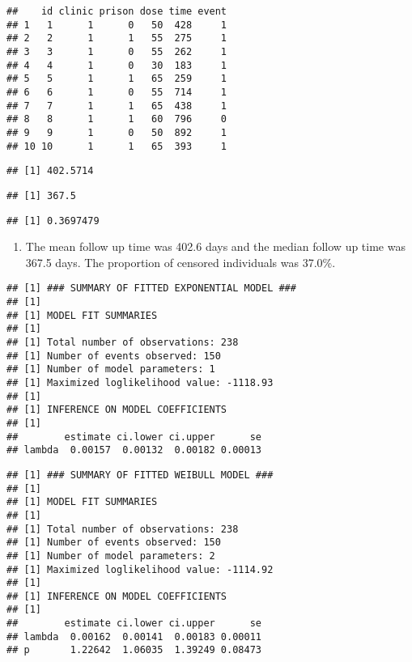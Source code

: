 \documentclass[
]{article}
\providecommand{\tightlist}{%
  \setlength{\itemsep}{0pt}\setlength{\parskip}{0pt}}
\begin{document}
\begin{verbatim}
##    id clinic prison dose time event
## 1   1      1      0   50  428     1
## 2   2      1      1   55  275     1
## 3   3      1      0   55  262     1
## 4   4      1      0   30  183     1
## 5   5      1      1   65  259     1
## 6   6      1      0   55  714     1
## 7   7      1      1   65  438     1
## 8   8      1      1   60  796     0
## 9   9      1      0   50  892     1
## 10 10      1      1   65  393     1
\end{verbatim}

\begin{verbatim}
## [1] 402.5714
\end{verbatim}

\begin{verbatim}
## [1] 367.5
\end{verbatim}

\begin{verbatim}
## [1] 0.3697479
\end{verbatim}

\begin{enumerate}
\def\labelenumi{(\alph{enumi})}
\tightlist
\item
  The mean follow up time was 402.6 days and the median follow up time
  was 367.5 days. The proportion of censored individuals was 37.0\%.
\end{enumerate}

\begin{verbatim}
## [1] ### SUMMARY OF FITTED EXPONENTIAL MODEL ###
## [1] 
## [1] MODEL FIT SUMMARIES
## [1] 
## [1] Total number of observations: 238  
## [1] Number of events observed: 150  
## [1] Number of model parameters: 1  
## [1] Maximized loglikelihood value: -1118.93  
## [1] 
## [1] INFERENCE ON MODEL COEFFICIENTS
## [1] 
##        estimate ci.lower ci.upper      se
## lambda  0.00157  0.00132  0.00182 0.00013
\end{verbatim}

\begin{verbatim}
## [1] ### SUMMARY OF FITTED WEIBULL MODEL ###
## [1] 
## [1] MODEL FIT SUMMARIES
## [1] 
## [1] Total number of observations: 238  
## [1] Number of events observed: 150  
## [1] Number of model parameters: 2  
## [1] Maximized loglikelihood value: -1114.92  
## [1] 
## [1] INFERENCE ON MODEL COEFFICIENTS
## [1] 
##        estimate ci.lower ci.upper      se
## lambda  0.00162  0.00141  0.00183 0.00011
## p       1.22642  1.06035  1.39249 0.08473
\end{verbatim}
\end{document}
